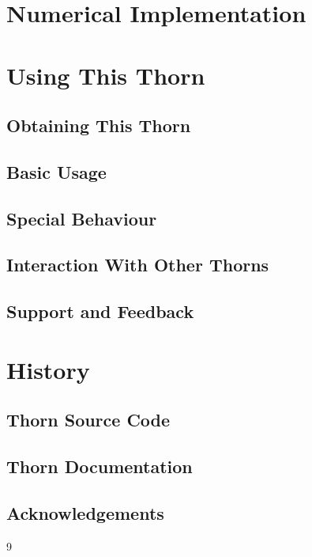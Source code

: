\section{Numerical Implementation}

\section{Using This Thorn}

\subsection{Obtaining This Thorn}

\subsection{Basic Usage}

\subsection{Special Behaviour}

\subsection{Interaction With Other Thorns}

\subsection{Support and Feedback}

\section{History}

\subsection{Thorn Source Code}

\subsection{Thorn Documentation}

\subsection{Acknowledgements}


\begin{thebibliography}{9}

\end{thebibliography}



